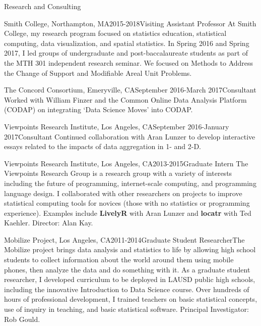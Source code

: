 \documentclass{resume} %
\begin{document}
\begin{rSection}{Research and Consulting}
\begin{pSubsection}{Smith College, }{Northampton, MA}{2015-2018}{Visiting Assistant Professor}
{At Smith College, my research program focused on statistics education, statistical computing, data visualization, and spatial statistics. In Spring 2016 and Spring 2017, I led groups of undergraduate and post-baccalaureate students as part of the MTH 301 independent research seminar. We focused on Methods to Address the Change of Support and Modifiable Areal Unit Problems.}
\end{pSubsection}


\begin{pSubsection}{The Concord Consortium, }{Emeryville, CA}{September 2016-March 2017}{Consultant}
{Worked with William Finzer and the Common Online Data Analysis Platform (CODAP) on integrating `Data Science Moves' into CODAP.}
\end{pSubsection}


\begin{pSubsection}{Viewpoints Research Institute, }{Los Angeles, CA}{September 2016-January 2017}{Consultant}
{Continued collaboration with Aran Lunzer to develop interactive essays related to the impacts of data aggregation in 1- and 2-D.}
\end{pSubsection}

\begin{pSubsection}{Viewpoints Research Institute, }{Los Angeles, CA}{2013-2015}{Graduate Intern}
{The Viewpoints Research Group is a research group with a variety of interests including the future of programming, internet-scale computing, and programming language design. I collaborated with other researchers on projects to improve statistical computing tools for novices (those with no statistics or programming experience). Examples include \textbf{LivelyR} with Aran Lunzer and \textbf{locatr} with Ted Kaehler. Director: Alan Kay.}
\end{pSubsection}

\begin{pSubsection}{Mobilize Project, }{Los Angeles, CA}{2011-2014}{Graduate Student Researcher}{The Mobilize project brings data analysis and statistics to life by allowing high school students to collect information about the world around them using mobile phones, then analyze the data and do something with it. As a graduate student researcher, I developed curriculum to be deployed in LAUSD public high schools, including the innovative Introduction to Data Science course. Over hundreds of hours of professional development, I trained teachers on basic statistical concepts, use of inquiry in teaching, and basic statistical software. Principal Investigator: Rob Gould.}
\end{pSubsection}
\end{rSection}
\end{document}
